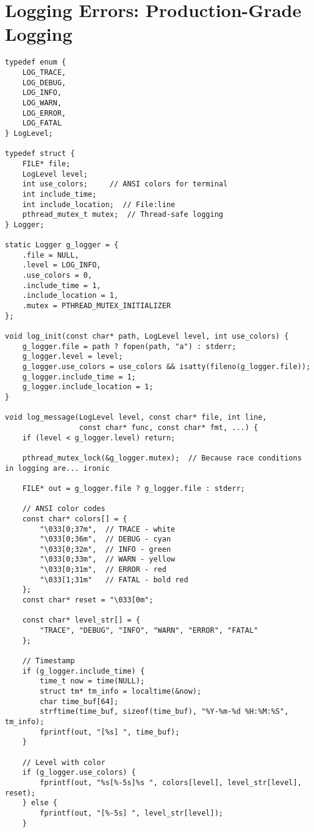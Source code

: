 \section{Logging Errors: Production-Grade Logging}

\begin{lstlisting}
typedef enum {
    LOG_TRACE,
    LOG_DEBUG,
    LOG_INFO,
    LOG_WARN,
    LOG_ERROR,
    LOG_FATAL
} LogLevel;

typedef struct {
    FILE* file;
    LogLevel level;
    int use_colors;     // ANSI colors for terminal
    int include_time;
    int include_location;  // File:line
    pthread_mutex_t mutex;  // Thread-safe logging
} Logger;

static Logger g_logger = {
    .file = NULL,
    .level = LOG_INFO,
    .use_colors = 0,
    .include_time = 1,
    .include_location = 1,
    .mutex = PTHREAD_MUTEX_INITIALIZER
};

void log_init(const char* path, LogLevel level, int use_colors) {
    g_logger.file = path ? fopen(path, "a") : stderr;
    g_logger.level = level;
    g_logger.use_colors = use_colors && isatty(fileno(g_logger.file));
    g_logger.include_time = 1;
    g_logger.include_location = 1;
}

void log_message(LogLevel level, const char* file, int line,
                 const char* func, const char* fmt, ...) {
    if (level < g_logger.level) return;

    pthread_mutex_lock(&g_logger.mutex);  // Because race conditions in logging are... ironic

    FILE* out = g_logger.file ? g_logger.file : stderr;

    // ANSI color codes
    const char* colors[] = {
        "\033[0;37m",  // TRACE - white
        "\033[0;36m",  // DEBUG - cyan
        "\033[0;32m",  // INFO - green
        "\033[0;33m",  // WARN - yellow
        "\033[0;31m",  // ERROR - red
        "\033[1;31m"   // FATAL - bold red
    };
    const char* reset = "\033[0m";

    const char* level_str[] = {
        "TRACE", "DEBUG", "INFO", "WARN", "ERROR", "FATAL"
    };

    // Timestamp
    if (g_logger.include_time) {
        time_t now = time(NULL);
        struct tm* tm_info = localtime(&now);
        char time_buf[64];
        strftime(time_buf, sizeof(time_buf), "%Y-%m-%d %H:%M:%S", tm_info);
        fprintf(out, "[%s] ", time_buf);
    }

    // Level with color
    if (g_logger.use_colors) {
        fprintf(out, "%s[%-5s]%s ", colors[level], level_str[level], reset);
    } else {
        fprintf(out, "[%-5s] ", level_str[level]);
    }


\end{lstlisting}
